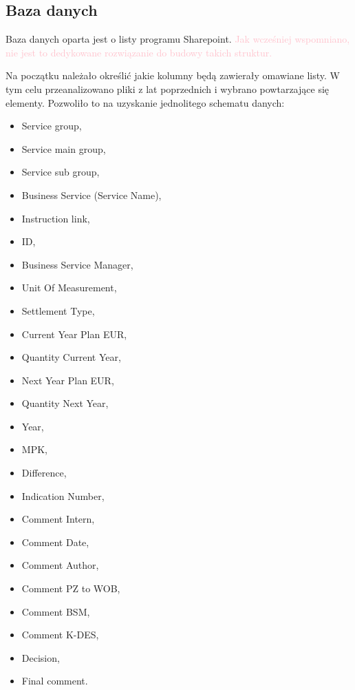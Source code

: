 \subsection{Baza danych}

Baza danych oparta jest o listy programu Sharepoint. \textcolor{pink}{Jak wcześniej wspomniano, nie jest to dedykowane rozwiązanie do budowy takich struktur. }

Na początku należało określić jakie kolumny będą zawierały omawiane listy. W tym celu przeanalizowano pliki z lat poprzednich i wybrano powtarzające się elementy. Pozwoliło to na uzyskanie jednolitego schematu danych:
\begin{itemize}
    \item Service group,
    \item Service main group,
    \item Service sub group,
    \item Business Service (Service Name),
    \item Instruction link,
    \item ID,
    \item Business Service Manager,
    \item Unit Of Measurement,
    \item Settlement Type,
    \item Current Year Plan EUR,
    \item Quantity Current Year,
    \item Next Year Plan EUR,
    \item Quantity Next Year,
    \item Year,
    \item MPK,
    \item Difference,
    \item Indication Number,
    \item Comment Intern,
    \item Comment Date,
    \item Comment Author,
    \item Comment PZ to WOB,
    \item Comment BSM,
    \item Comment K-DES,
    \item Decision,
    \item Final comment.
\end{itemize} 



